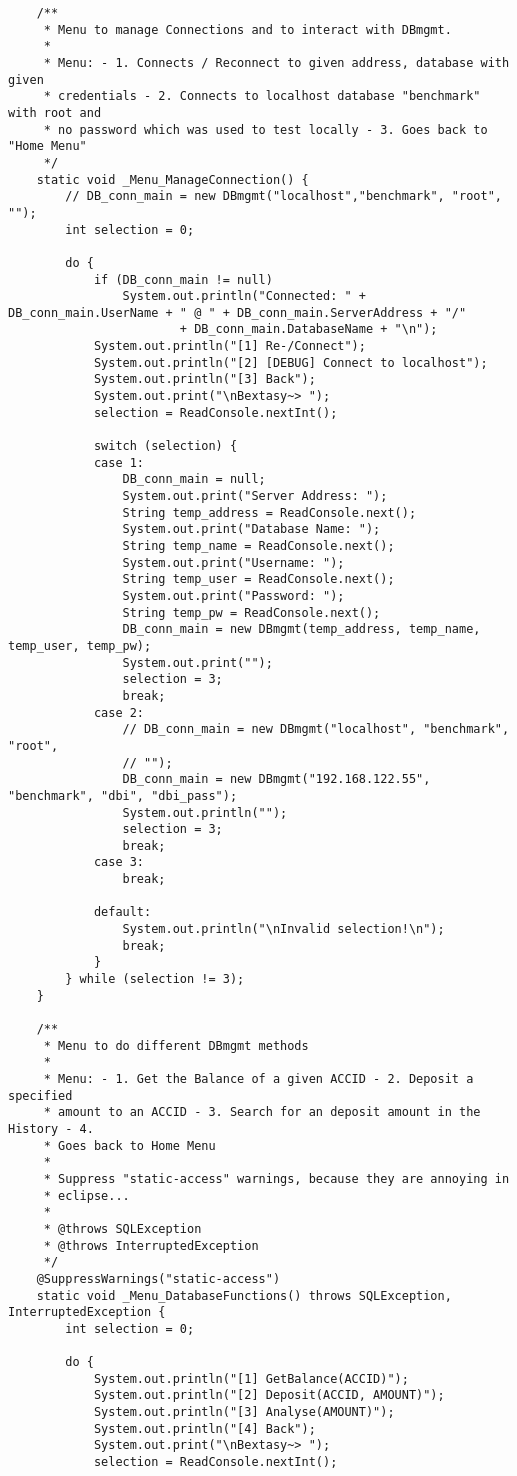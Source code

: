 \documentclass[a4paper, bibliography=totoc, 12pt]{scrartcl}
\begin{document}
\begin{lstlisting}
	/**
	 * Menu to manage Connections and to interact with DBmgmt.
	 * 
	 * Menu: - 1. Connects / Reconnect to given address, database with given
	 * credentials - 2. Connects to localhost database "benchmark" with root and
	 * no password which was used to test locally - 3. Goes back to "Home Menu"
	 */
	static void _Menu_ManageConnection() {
		// DB_conn_main = new DBmgmt("localhost","benchmark", "root", "");
		int selection = 0;

		do {
			if (DB_conn_main != null)
				System.out.println("Connected: " + DB_conn_main.UserName + " @ " + DB_conn_main.ServerAddress + "/"
						+ DB_conn_main.DatabaseName + "\n");
			System.out.println("[1] Re-/Connect");
			System.out.println("[2] [DEBUG] Connect to localhost");
			System.out.println("[3] Back");
			System.out.print("\nBextasy~> ");
			selection = ReadConsole.nextInt();

			switch (selection) {
			case 1:
				DB_conn_main = null;
				System.out.print("Server Address: ");
				String temp_address = ReadConsole.next();
				System.out.print("Database Name: ");
				String temp_name = ReadConsole.next();
				System.out.print("Username: ");
				String temp_user = ReadConsole.next();
				System.out.print("Password: ");
				String temp_pw = ReadConsole.next();
				DB_conn_main = new DBmgmt(temp_address, temp_name, temp_user, temp_pw);
				System.out.print("");
				selection = 3;
				break;
			case 2:
				// DB_conn_main = new DBmgmt("localhost", "benchmark", "root",
				// "");
				DB_conn_main = new DBmgmt("192.168.122.55", "benchmark", "dbi", "dbi_pass");
				System.out.println("");
				selection = 3;
				break;
			case 3:
				break;

			default:
				System.out.println("\nInvalid selection!\n");
				break;
			}
		} while (selection != 3);
	}

	/**
	 * Menu to do different DBmgmt methods
	 * 
	 * Menu: - 1. Get the Balance of a given ACCID - 2. Deposit a specified
	 * amount to an ACCID - 3. Search for an deposit amount in the History - 4.
	 * Goes back to Home Menu
	 * 
	 * Suppress "static-access" warnings, because they are annoying in
	 * eclipse...
	 * 
	 * @throws SQLException
	 * @throws InterruptedException
	 */
	@SuppressWarnings("static-access")
	static void _Menu_DatabaseFunctions() throws SQLException, InterruptedException {
		int selection = 0;

		do {
			System.out.println("[1] GetBalance(ACCID)");
			System.out.println("[2] Deposit(ACCID, AMOUNT)");
			System.out.println("[3] Analyse(AMOUNT)");
			System.out.println("[4] Back");
			System.out.print("\nBextasy~> ");
			selection = ReadConsole.nextInt();


\end{lstlisting}
\end{document}
